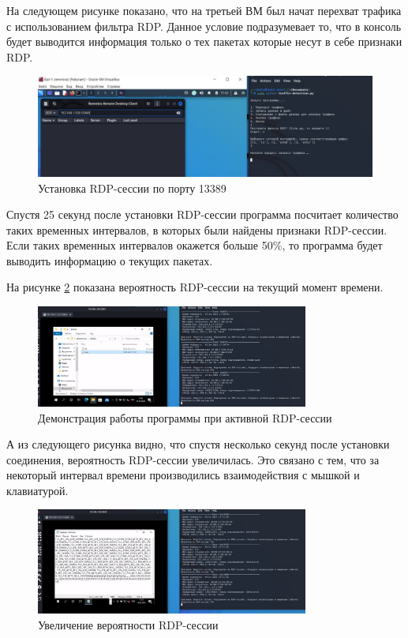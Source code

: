 \documentclass[bachelor, och, coursework]{SCWorks}
\begin{document}
На следующем рисунке показано, что на третьей ВМ был начат перехват трафика с использованием фильтра RDP. Данное условие подразумевает то,
что в консоль будет выводится информация только о тех пакетах которые несут в себе признаки RDP.

\begin{figure}[H]
  \centering
  \includegraphics[width=1\textwidth]{photo/rdpport2.jpg}
  \caption{Установка RDP-сессии по порту 13389}
  \label{rdpport2}
\end{figure}

Спустя 25 секунд после установки RDP-сессии программа посчитает количество таких временных интервалов, в которых были найдены
признаки RDP-сессии. Если таких временных интервалов окажется больше 50\%, то программа будет выводить информацию о текущих пакетах.

На рисунке \ref{rdpport3} показана вероятность RDP-сессии на текущий момент времени.

\begin{figure}[H]
  \centering
  \includegraphics[width=0.8\textwidth]{photo/rdpport3.jpg}
  \caption{Демонстрация работы программы при активной RDP-сессии}
  \label{rdpport3}
\end{figure}

А из следующего рисунка видно, что спустя несколько секунд после установки соединения, вероятность RDP-сессии увеличилась.
Это связано с тем, что за некоторый интервал времени производились взаимодействия с мышкой и клавиатурой.


\begin{figure}[H]
  \centering
  \includegraphics[width=0.8\textwidth]{photo/rdpport4.jpg}
  \caption{Увеличение вероятности RDP-сессии}
  \label{rdpport4}
\end{figure}
\end{document}
